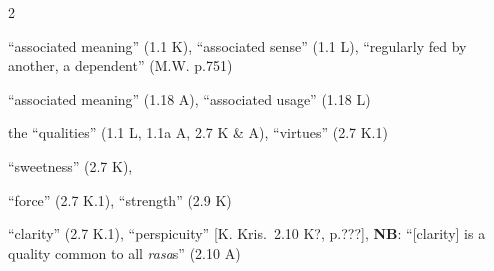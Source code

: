 \documentclass[10pt]{article}
\begin{document}
\begin{multicols}{2}
\begin{enumerate}[
			leftmargin=0em,
			rightmargin=0em,
		]




		 ``associated meaning'' (1.1 K), ``associated sense'' (1.1 L), ``regularly fed by another, a dependent'' (M.W. p.751)
		\begin{itemize}
			 ``associated meaning'' (1.18 A), ``associated usage'' (1.18 L)
		\end{itemize}






		 the ``qualities'' (1.1 L, 1.1a A, 2.7 K \& A), ``virtues'' (2.7 K.1)
		\begin{enumerate}
			 ``sweetness'' (2.7 K), %

			 ``force'' (2.7 K.1),
			``strength'' (2.9 K)

			 ``clarity'' (2.7 K.1),
			``perspicuity'' [K. Kris.\ 2.10 K?, p.???],
			\textbf{NB}: ``[clarity] is a quality common to all \textit{rasa}s'' (2.10 A)


\end{enumerate}
\end{enumerate}
\end{multicols}
\end{document}
